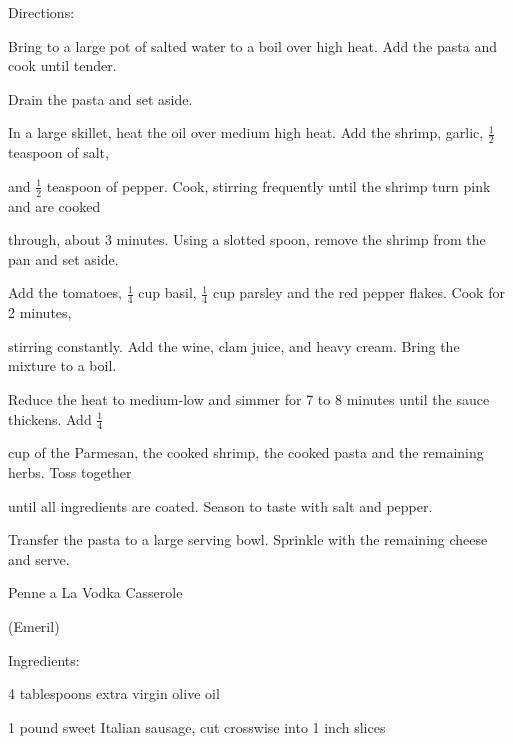 \documentclass[a4paper,portrait,12pt]{book}
\begin{document}
Directions:




Bring to a large pot of salted water to a boil over high heat. Add the pasta and cook until tender.




Drain the pasta and set aside.




In a large skillet, heat the oil over medium high heat. Add the shrimp, garlic, $\frac{1}{2}$ teaspoon of salt,




and $\frac{1}{2}$ teaspoon of pepper. Cook, stirring frequently until the shrimp turn pink and are cooked




through, about 3 minutes. Using a slotted spoon, remove the shrimp from the pan and set aside.




Add the tomatoes, $\frac{1}{4}$ cup basil, $\frac{1}{4}$ cup parsley and the red pepper flakes. Cook for 2 minutes,




stirring constantly. Add the wine, clam juice, and heavy cream. Bring the mixture to a boil.




Reduce the heat to medium-low and simmer for 7 to 8 minutes until the sauce thickens. Add $\frac{1}{4}$




cup of the Parmesan, the cooked shrimp, the cooked pasta and the remaining herbs. Toss together




until all ingredients are coated. Season to taste with salt and pepper.




Transfer the pasta to a large serving bowl. Sprinkle with the remaining cheese and serve.







\newpage
Penne a La Vodka Casserole




(Emeril)




Ingredients:




4 tablespoons extra virgin olive oil




1 pound sweet Italian sausage, cut crosswise into 1 inch slices
\end{document}
